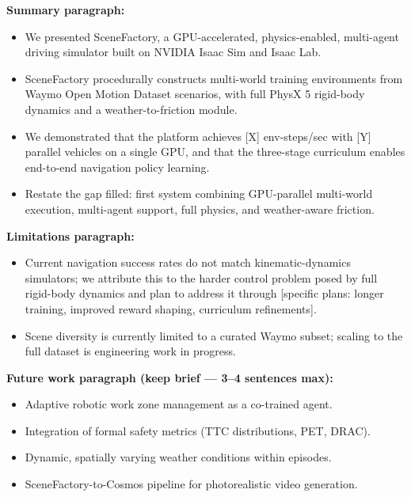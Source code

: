 \begin{chatbox}
\textbf{Summary paragraph:}
\begin{itemize}
  \item We presented SceneFactory, a GPU-accelerated, physics-enabled, multi-agent driving simulator built on NVIDIA Isaac Sim and Isaac Lab.
  \item SceneFactory procedurally constructs multi-world training environments from Waymo Open Motion Dataset scenarios, with full PhysX 5 rigid-body dynamics and a weather-to-friction module.
  \item We demonstrated that the platform achieves [X] env-steps/sec with [Y] parallel vehicles on a single GPU, and that the three-stage curriculum enables end-to-end navigation policy learning.
  \item Restate the gap filled: first system combining GPU-parallel multi-world execution, multi-agent support, full physics, and weather-aware friction.
\end{itemize}

\textbf{Limitations paragraph:}
\begin{itemize}
  \item Current navigation success rates do not match kinematic-dynamics simulators; we attribute this to the harder control problem posed by full rigid-body dynamics and plan to address it through [specific plans: longer training, improved reward shaping, curriculum refinements].
  \item Scene diversity is currently limited to a curated Waymo subset; scaling to the full dataset is engineering work in progress.
\end{itemize}

\textbf{Future work paragraph (keep brief --- 3--4 sentences max):}
\begin{itemize}
  \item Adaptive robotic work zone management as a co-trained agent.
  \item Integration of formal safety metrics (TTC distributions, PET, DRAC).
  \item Dynamic, spatially varying weather conditions within episodes.
  \item SceneFactory-to-Cosmos pipeline for photorealistic video generation.
\end{itemize}
\end{chatbox}

